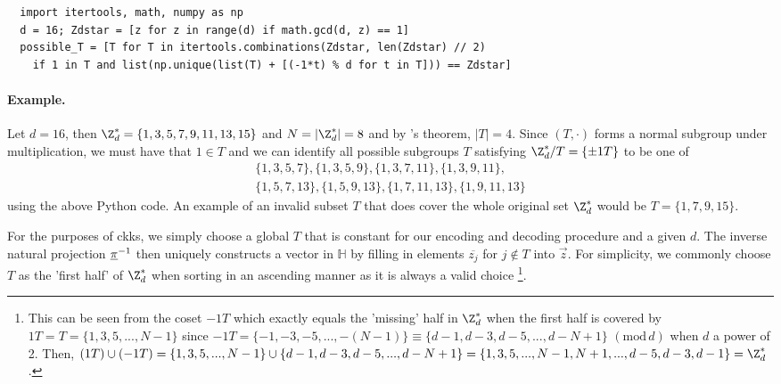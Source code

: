 \begin{verbatim}
  import itertools, math, numpy as np
  d = 16; Zdstar = [z for z in range(d) if math.gcd(d, z) == 1]
  possible_T = [T for T in itertools.combinations(Zdstar, len(Zdstar) // 2)
    if 1 in T and list(np.unique(list(T) + [(-1*t) % d for t in T])) == Zdstar]
\end{verbatim}

\paragraph{Example.}
Let $d = 16$, then $\Z_d^* = \{1, 3, 5, 7, 9, 11, 13, 15\}$ and $N = |\Z_d^*| = 8$ and by 's theorem, $|T| = 4$.
Since $(T, \cdot)$ forms a normal subgroup under multiplication, we must have that $1 \in T$ and we can identify all possible subgroups $T$ satisfying $\Z_d^* / T = \{\pm 1T\}$ to be one of
\begin{align*}
  \{1, 3, 5, 7\},
  \{1, 3, 5, 9\},
  \{1, 3, 7, 11\},
  \{1, 3, 9, 11\}, \\
  \{1, 5, 7, 13\},
  \{1, 5, 9, 13\},
  \{1, 7, 11, 13\},
  \{1, 9, 11, 13\}
\end{align*}
using the above Python code. An example of an invalid subset $T$ that does cover the whole original set $\Z_d^*$ would be $T = \{1, 7, 9, 15\}$.

For the purposes of \gls{ckks}, we simply choose a global $T$ that is constant for our encoding and decoding procedure and a given $d$.
The inverse natural projection $\underline{\pi}^{-1}$ then uniquely constructs a vector in $\mathbb{H}$ by filling in elements $\overline{z_j}$ for $j \notin T$ into $\vec{z}$.
For simplicity, we commonly choose $T$ as the 'first half' of $\Z_d^*$ when sorting in an ascending manner as it is always a valid choice
\footnote{
  This can be seen from the coset $-1T$ which exactly equals the 'missing' half in $\Z_d^*$ when the first half is covered by $1T = T = \{1, 3, 5, ..., N-1\}$ since $-1T = \{-1, -3, -5, ..., -(N-1)\} \equiv \{d-1, d-3, d-5, ..., d-N+1\}$ $(\text{mod}\, d)$ when $d$ a power of 2.
  Then, $(1T) \cup (-1T) = \{1, 3, 5, ..., N-1\} \cup \{d-1, d-3, d-5, ..., d-N+1\} = \{1, 3, 5, ..., N-1, N+1, ..., d-5, d-3, d-1\} = \Z_d^*$.
}.

